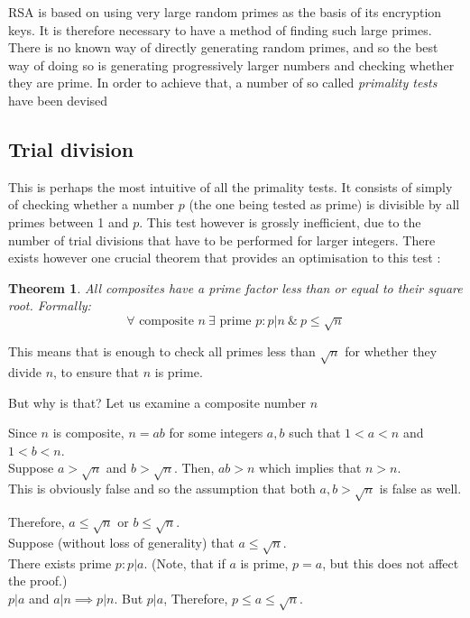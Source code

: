 \documentclass[12pt, titlepage]{article}
\newtheorem{theorem}{Theorem}
\begin{document}
RSA is based on using very large random primes as the basis of its encryption keys. It is
therefore necessary to have a method of finding such large primes. There is no known way of
directly generating random primes, and so the best way of doing so is generating
progressively larger numbers and checking whether they are prime. In order to achieve that,
a number of so called \emph{primality tests} have been devised  

\subsection{Trial division}

This is perhaps the most intuitive of all the primality tests. It consists of simply of
checking whether a number $p$ (the one being tested as prime) is divisible by all primes
between 1 and $p$. This test however is grossly inefficient, due to the number of trial
divisions that have to be performed for larger integers. There exists however one crucial
theorem that provides an optimisation to this test \autocite[276]{haese_ib_options}:
%
\begin{theorem} \label{th:prime_factors_less_than_root}
    All composites have a prime factor less than or equal to their square
    root. Formally:\\
    $$\forall \text{ composite } n \: \exists \text{ prime } p:p|n \: \& \: p \leq \sqrt{n}$$
\end{theorem}
%
%
This means that is enough to check all primes less than $\sqrt{n}$ for whether they divide
$n$, to ensure that $n$ is prime. 

But why is that? Let us examine a composite number $n$

Since $n$ is composite, $n=ab$ for some integers $a, b$ such that $1<a<n$ and $1<b<n$.\\
Suppose $a>\sqrt{n}$ and $b>\sqrt{n}$. Then, $ab>n$ which implies that $n>n$. \\
This is obviously false and so the assumption that both $a,b > \sqrt{n}$ is false as well.

Therefore, $a \leq \sqrt{n}$ or $b \leq \sqrt{n}$. \\
Suppose (without loss of generality) that $a \leq \sqrt{n}$.\\
There exists prime $p: p|a$. (Note, that if $a$ is prime, $p = a$, but this does not
affect the proof.)\\
$p|a$ and $a|n \implies p|n$. But $p|a$, Therefore,  $p \leq a \leq \sqrt{n}$.
\end{document}
